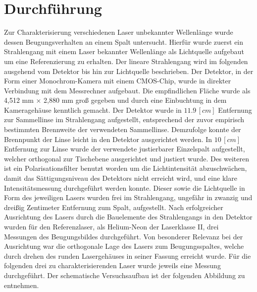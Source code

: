%
%
\section{Durchführung}
Zur Charakterisierung verschiedenen Laser unbekannter Wellenlänge wurde dessen Beugungsverhalten an einem Spalt untersucht. Hierfür wurde zuerst ein Strahlengang mit einem Laser bekannter Wellenlänge als Lichtquelle aufgebaut um eine Referenzierung zu erhalten. Der lineare Strahlengang wird im folgenden ausgehend vom Detektor bis hin zur Lichtquelle beschrieben. Der Detektor, in der Form einer Monochrom-Kamera mit einem CMOS-Chip, wurde in direkter Verbindung mit dem Messrechner aufgebaut. Die empfindlichen Fläche wurde als 4,512 mm × 2,880 mm groß gegeben und durch eine Einbuchtung in dem Kameragehäuse kenntlich gemacht. Der Detektor wurde in $11.9 \,[\si{cm}]$ Entfernung zur Sammellinse im Strahlengang aufgestellt, entsprechend der zuvor empirisch bestimmten Brennweite der verwendeten Sammellinse. Demzufolge konnte der Brennpunkt der Linse leicht in den Detektor ausgerichtet werden. In $10 \,[\si{cm}]$ Entfernung zur Linse wurde der verwendete justierbarer Einzelspalt aufgestellt, welcher orthogonal zur Tischebene ausgerichtet und justiert wurde. Des weiteren ist ein Polarisationsfilter benutzt worden um die Lichtintensität abzuschwächen, damit das Sättigungsniveau des Detektors nicht erreicht wird, und eine klare Intensitätsmessung durchgeführt werden konnte. Dieser sowie die Lichtquelle in Form des jeweiligen Lasers wurden frei im Strahlengang, ungefähr in zwanzig und dreißig Zentimeter Entfernung zum Spalt, aufgestellt. Nach erfolgreicher Ausrichtung des Lasers durch die Bauelemente des Strahlengangs in den Detektor wurden für den Referenzlaser, als Helium-Neon der Laserklasse II, drei Messungen des Beugungsbildes durchgeführt. Von besonderer Relevanz bei der Ausrichtung war die orthogonale Lage des Lasers zum Beugungsspaltes, welche durch drehen des runden Lasergehäuses in seiner Fassung erreicht wurde. Für die folgenden drei zu charakterisierenden Laser wurde jeweils eine Messung durchgeführt. Der schematische Versuchsaufbau ist der folgenden Abbildung zu entnehmen. 
\\
